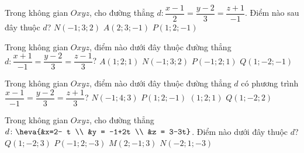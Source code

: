 \begin{ex}%
	Trong không gian $Oxyz$, cho đường thẳng $d \colon \dfrac{x-1}{2}=\dfrac{y-2}{3}=\dfrac{z+1}{-1}$. Điểm nào  sau đây thuộc $d$?
		 {$N(-1;3;2)$}
		 {$A(2;3;-1)$}
		{\True $P(1;2;-1)$} 
\end{ex}

\begin{ex}%
	Trong không gian $Oxyz$, điểm nào dưới  đây thuộc đường thẳng $d \colon \dfrac{x+1}{-1}=\dfrac{y-2}{3}=\dfrac{z-1}{3}$?
	 \choice
		{$A(1;  2; 1)$}
		 {$N(-1; 3; 2)$}
		{\True $P(-1;  2; 1)$}
		{$Q(1;-2;-1)$} 
\end{ex}

\begin{ex}%
	Trong không gian $Oxyz$, điểm nào dưới đây thuộc đường thẳng $d$  có phương trình $\dfrac{x-1}{-1} = \dfrac{y-2}{3} = \dfrac{z+1}{3}$?
	 \choice
		 {$N(-1;4;3)$}
		 {\True $P(1;2;-1)$}
		 {$(1;2;1)$}
		{$Q(1;-2;2)$} 
\end{ex}

\begin{ex}%
	Trong không gian $Oxyz$,  cho đường thẳng $d\colon\heva{&x=2- t \\ &y = -1+2t \\ &z = 3-3t}$. Điểm nào dưới đây thuộc $d$?
	 \choice
		{$Q(1; -2;  3)$}
		{$P(-1;  2; -3)$}
		{\True $M(2; -1;  3)$}
		 {$N(-2; 1; -3)$}
\end{ex}



